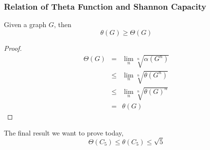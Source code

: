       \begin{frame}
            \frametitle{Relation of Theta Function and Shannon Capacity}

            \begin{theorem}
                  Given a graph $ G $, then
                  \begin{equation}
                        \theta(G) \geq \Theta(G)
                  \end{equation}
            \end{theorem}

            \pause

            \begin{proof}
                  \begin{eqnarray}
                        \Theta(G) &=& \lim_{n} \sqrt[n]{\alpha(G^{n})} \\
                        &\leq& \lim_{n} \sqrt[n]{\theta(G^{n})} \\
                        &\leq& \lim_{n} \sqrt[n]{\theta(G)^{n}} \\
                        &=& \theta(G)
                  \end{eqnarray}
            \end{proof}
      \end{frame}

      \begin{frame}
            The final result we want to prove today,
            \begin{equation}
                  \Theta(C_{5}) \le \theta(C_{5}) \le \sqrt{5}
            \end{equation}
      \end{frame}